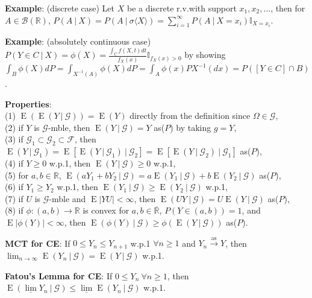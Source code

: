\documentclass[paper=letter,fontsize=2.89mm]{scrartcl}
\DeclareMathOperator{\E}{E}
\newcommand\given[1][]{\:#1\vert\:}
\newcommand{\convas}{\stackrel{\text{as}}{\longrightarrow}}
\newcommand{\Borel}{\mathcal{B}}
\newcommand{\R}{\mathbb{R}}
\newcommand\indicate[1]{\mathbb{I}_{ #1 }}
\newcommand\abs[1]{\left| #1 \right|}
\begin{document}
\begin{multicols*}{3}
\textbf{Example}: (discrete case) Let $X$ be a discrete r.v.\@ with support $x_1, x_2, \dots$, then for $A \in \Borel(\R)$, $P(A \given X) = P(A \given \sigma\langle X \rangle ) = \sum_{i=1}^\infty P(A \given X = x_i )\indicate{X = x_i}$. \\ \medskip

\textbf{Example}: (absolutely continuous case) $P(Y\in C \given X) = \phi(X) = \frac{\int_C f(X, t) dt}{f_X(x)} \indicate{f_X(x) > 0}$ by showing $\int_B \phi(X) dP = \int_{X^{-1}(A)} \phi(X) dP = \int_A \phi(x) PX^{-1}(dx) =
P([Y\in C] \cap B)$. \\ \medskip

\textbf{Properties}: \\
(1) $\E(\E(Y \given \mathcal{G})) = \E(Y)$ directly from the definition since $\Omega \in \mathcal{G}$, \\
(2) if $Y$ is $\mathcal{G}$-mble, then $\E(Y \given \mathcal{G}) = Y$ as($P$) by taking $g = Y$, \\
(3) if $\mathcal{G}_1 \subset \mathcal{G}_2 \subset \mathcal{F}$, then 
$\E(Y \given \mathcal{G}_1) = \E [\E(Y \given \mathcal{G}_1) \given \mathcal{G}_2] =  \E [\E(Y \given \mathcal{G}_2) \given \mathcal{G}_1]$ as($P$), \\
(4) if $Y \ge 0$ w.p.1, then $\E(Y \given \mathcal{G}) \ge 0$ w.p.1, \\ 
(5) for $a,b\in\R$, $\E(aY_1 + bY_2\given\mathcal{G}) = a\E(Y_1\given\mathcal{G}) + b\E(Y_2\given\mathcal{G})$ as($P$), \\
(6) if $Y_1 \ge Y_2$ w.p.1, then $\E(Y_1\given\mathcal{G}) \ge \E(Y_2 \given \mathcal{G})$ w.p.1, \\
(7) if $U$ is $\mathcal{G}$-mble and $\E\abs{YU} < \infty$, then $\E(UY\given\mathcal{G}) = U\E(Y\given\mathcal{G})$ as($P$), \\
(8) if $\phi: (a,b) \to \R$ is convex for $a,b\in\overline{\R}$, $P(Y \in (a,b)) = 1$, and $\E\abs{\phi(Y)} < \infty$, then $\E(\phi(Y)\given\mathcal{G}) \ge \phi(\E(Y\given\mathcal{G}))$ as($P$). \\ \medskip

\textbf{MCT for CE}: If $0 \le Y_n \le Y_{n+1}$ w.p.1 $\forall n \ge 1$ and $Y_n \convas Y$, then $\lim_{n\to\infty} \E(Y_n \given \mathcal{G}) = \E(Y \given \mathcal{G})$ w.p.1. \\ \medskip

\textbf{Fatou's Lemma for CE}: If $0 \le Y_n ~ \forall n \ge 1$, then $\E(\underline{\lim} Y_n \given \mathcal{G}) \le \underline{\lim}\E(Y_n \given \mathcal{G})$ w.p.1. \\ \medskip


\end{multicols*}
\end{document}
